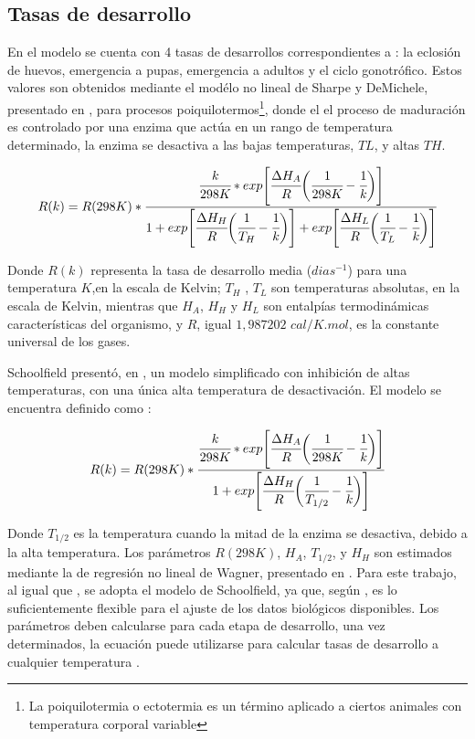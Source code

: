 \subsection{Tasas de desarrollo}
\label{subsec:cap4-tasas de desarrollo}
En el modelo se cuenta con 4 tasas de desarrollos correspondientes a : la eclosión de huevos,
emergencia a pupas, emergencia a adultos y el ciclo gonotrófico. Estos valores son obtenidos
mediante el modélo no lineal de Sharpe y DeMichele, presentado en \cite{sharpe1977reaction}, para procesos poiquilotermos\footnote{ La poiquilotermia o ectotermia es un término aplicado a ciertos
animales con temperatura corporal variable}, donde el el proceso de maduración es controlado por
una enzima que actúa en un rango de temperatura determinado, la enzima se desactiva a las bajas temperaturas, $TL$, y altas $TH$.

\begin{equation} \label{eq:sharpe-demichele}
   R(k)  = R(298K) *\cfrac{ \cfrac{k}{298K} *
    exp \Bigg[
            \cfrac{\Delta H_{A}}{R} \bigg(\cfrac{1}{298K} - \cfrac{1}{k}\bigg)
        \Bigg]}
    {1 + exp\Bigg[\cfrac{\Delta H_{H}}{R} \bigg(\cfrac{1}{T_{H}}- \cfrac{1}{k}\bigg)\Bigg] +  exp\Bigg[\cfrac{\Delta H_{L}}{R} \bigg(\cfrac{1}{T_{L}}- \cfrac{1}{k}\bigg)\Bigg]}
\end{equation}

Donde $R(k)$ representa la tasa de desarrollo media ($dias^{-1}$) para una temperatura $K$,en la
escala de Kelvin; $T_{H}$ , $T_{L}$ son temperaturas absolutas, en la escala de Kelvin, mientras
que $H_{A}$, $H_{H}$ y $H_{L}$ son entalpías termodinámicas características del organismo, y $R$,
igual $1,987202$ $cal/K.mol$, es la constante universal de los gases.

Schoolfield presentó, en \cite{schoolfield1981non}, un modelo simplificado con inhibición de altas
temperaturas, con una única alta temperatura de desactivación. El modelo se encuentra definido
como :

\begin{equation} \label{eq:schoolfield}
   R(k)  = R(298K) *\cfrac{ \cfrac{k}{298K} *
    exp \Bigg[
            \cfrac{\Delta H_{A}}{R} \bigg(\cfrac{1}{298K} - \cfrac{1}{k}\bigg)
        \Bigg]}
    {1 + exp\Bigg[\cfrac{\Delta H_{H}}{R} \bigg(\cfrac{1}{T_{1/2}}- \cfrac{1}{k}\bigg)\Bigg] }
\end{equation}

Donde $T_{1/2}$ es la temperatura cuando la mitad de la enzima se desactiva, debido a la alta
temperatura. Los parámetros $R(298K)$, $H_{A}$, $T_{1/2}$, y $H_{H}$ son estimados mediante la
de regresión no lineal de Wagner, presentado en \cite{wagner1984modeling}. Para este trabajo,
al igual que \cite{rueda1990temperature, otero2006stochastic}, se adopta el modelo de Schoolfield,
ya que, según \cite{otero2006stochastic}, es lo suficientemente flexible para el ajuste de los
datos biológicos disponibles. Los parámetros deben calcularse para cada etapa de desarrollo, una
vez determinados, la ecuación puede utilizarse para calcular tasas de desarrollo a cualquier
temperatura \cite{rueda1990temperature}.
